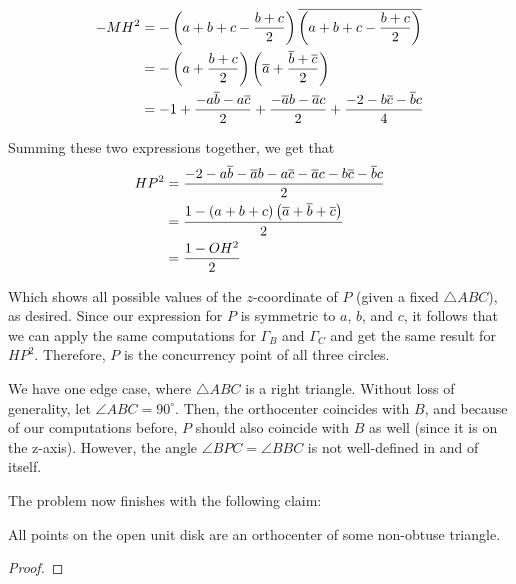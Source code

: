 \documentclass[10pt]{../usamts}
\begin{document}
\begin{solution}
\begin{align*}
    -MH^2 &= -\left( a+b+c - \frac{b+c}{2} \right)\overline{\left( a+b+c - \frac{b+c}{2} \right)}\\
          &= -\left( a + \frac{b+c}{2} \right)\left( \overline{a}+\frac{\overline{b}+\overline{c}}{2} \right)\\
          &= -1 + \frac{-a\overline{b}-a\overline{c}}{2} + \frac{-\overline{a}b-\overline{a}c}{2} + \frac{-2-b\overline{c}-\overline{b}c}{4}\\
\end{align*}

Summing these two expressions together, we get that
\begin{align*}
    HP^2 &= \frac{-2 - a\overline{b}-\overline{a}b -a\overline{c}-\overline{a}{c} - b\overline{c}-\overline{b}{c}}{2}\\
         &= \frac{1 - \left( a+b+c \right)\left( \overline{a}+\overline{b}+\overline{c} \right)}{2}\\
         &= \frac{1 - OH^2}{2}\\
\end{align*}

Which shows all possible values of the $z$-coordinate of $P$ (given a fixed $\triangle ABC$), as desired. Since our expression for $P$ is symmetric to $a$, $b$, and $c$, it follows that we can apply the same computations for $\Gamma_B$ and $\Gamma_C$ and get the same result for $HP^2$. Therefore, $P$ is the concurrency point of all three circles.

We have one edge case, where $\triangle ABC$ is a right triangle. Without loss of generality, let $\angle ABC = 90^\circ$. Then, the orthocenter coincides with $B$, and because of our computations before, $P$ should also coincide with $B$ as well (since it is on the z-axis). However, the angle $\angle BPC = \angle BBC$ is not well-defined in and of itself.

The problem now finishes with the following claim:

\begin{claim}
    All points on the open unit disk are an orthocenter of some non-obtuse triangle.
\end{claim}
\begin{proof}


\end{proof}
\end{solution}
\end{document}
